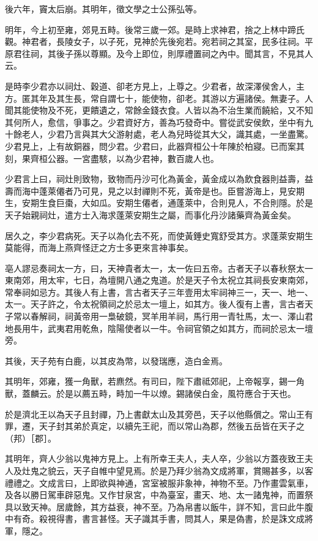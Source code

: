 後六年，竇太后崩。其明年，徵文學之士公孫弘等。

明年，今上初至雍，郊見五畤。後常三歲一郊。是時上求神君，捨之上林中蹄氏觀。神君者，長陵女子，以子死，見神於先後宛若。宛若祠之其室，民多往祠。平原君往祠，其後子孫以尊顯。及今上即位，則厚禮置祠之內中。聞其言，不見其人云。

是時李少君亦以祠灶、穀道、卻老方見上，上尊之。少君者，故深澤侯舍人，主方。匿其年及其生長，常自謂七十，能使物，卻老。其游以方遍諸侯。無妻子。人聞其能使物及不死，更饋遺之，常餘金錢衣食。人皆以為不治生業而饒給，又不知其何所人，愈信，爭事之。少君資好方，善為巧發奇中。嘗從武安侯飲，坐中有九十餘老人，少君乃言與其大父游射處，老人為兒時從其大父，識其處，一坐盡驚。少君見上，上有故銅器，問少君。少君曰，此器齊桓公十年陳於柏寢。已而案其刻，果齊桓公器。一宮盡駭，以為少君神，數百歲人也。

少君言上曰，祠灶則致物，致物而丹沙可化為黃金，黃金成以為飲食器則益壽，益壽而海中蓬萊僊者乃可見，見之以封禪則不死，黃帝是也。臣嘗游海上，見安期生，安期生食巨棗，大如瓜。安期生僊者，通蓬萊中，合則見人，不合則隱。於是天子始親祠灶，遣方士入海求蓬萊安期生之屬，而事化丹沙諸藥齊為黃金矣。

居久之，李少君病死。天子以為化去不死，而使黃錘史寬舒受其方。求蓬萊安期生莫能得，而海上燕齊怪迂之方士多更來言神事矣。

亳人謬忌奏祠太一方，曰，天神貴者太一，太一佐曰五帝。古者天子以春秋祭太一東南郊，用太牢，七日，為壇開八通之鬼道。於是天子令太祝立其祠長安東南郊，常奉祠如忌方。其後人有上書，言古者天子三年壹用太牢祠神三一，天一、地一、太一。天子許之，令太祝領祠之於忌太一壇上，如其方。後人復有上書，言古者天子常以春解祠，祠黃帝用一梟破鏡，冥羊用羊祠，馬行用一青牡馬，太一、澤山君地長用牛，武夷君用乾魚，陰陽使者以一牛。令祠官領之如其方，而祠於忌太一壇旁。

其後，天子苑有白鹿，以其皮為幣，以發瑞應，造白金焉。

其明年，郊雍，獲一角獸，若麃然。有司曰，陛下肅祗郊祀，上帝報享，錫一角獸，蓋麟云。於是以薦五畤，畤加一牛以燎。錫諸侯白金，風符應合于天也。

於是濟北王以為天子且封禪，乃上書獻太山及其旁邑，天子以他縣償之。常山王有罪，遷，天子封其弟於真定，以續先王祀，而以常山為郡，然後五岳皆在天子之（邦）［郡］。

其明年，齊人少翁以鬼神方見上。上有所幸王夫人，夫人卒，少翁以方蓋夜致王夫人及灶鬼之貌云，天子自帷中望見焉。於是乃拜少翁為文成將軍，賞賜甚多，以客禮禮之。文成言曰，上即欲與神通，宮室被服非象神，神物不至。乃作畫雲氣車，及各以勝日駕車辟惡鬼。又作甘泉宮，中為臺室，畫天、地、太一諸鬼神，而置祭具以致天神。居歲餘，其方益衰，神不至。乃為帛書以飯牛，詳不知，言曰此牛腹中有奇。殺視得書，書言甚怪。天子識其手書，問其人，果是偽書，於是誅文成將軍，隱之。

